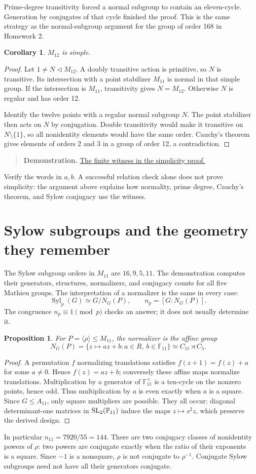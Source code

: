 \documentclass[12pt,letterpaper]{article}
\newtheorem{proposition}[theorem]{Proposition}
\newtheorem{corollary}[theorem]{Corollary}
\theoremstyle{definition}
\theoremstyle{remark}
\newenvironment{toolnote}{\begin{quote}\small\color{navy}}{\end{quote}}
\newcommand{\F}{\mathbb F}\newcommand{\Z}{\mathbb Z}
\DeclareMathOperator{\Syl}{Syl}
\newcommand{\pageheading}[1]{\clearpage\section{#1}}
\newcommand{\demolink}[2]{\href{https://gtevelev-max.github.io/mathieu/\##1}{#2}}
\newcommand{\demobox}[2]{\begin{toolnote}\textbf{Demonstration.} \demolink{#1}{#2}\end{toolnote}}
\begin{document}
Prime-degree transitivity forced a normal subgroup to contain an eleven-cycle. Generation by conjugates of that cycle finished the proof. This is the same strategy as the normal-subgroup argument for the group of order 168 in Homework 2.

\begin{corollary}
$M_{12}$ is simple.
\end{corollary}
\begin{proof}
Let $1\ne N\lhd M_{12}$. A doubly transitive action is primitive, so $N$ is transitive. Its intersection with a point stabilizer $M_{11}$ is normal in that simple group. If the intersection is $M_{11}$, transitivity gives $N=M_{12}$. Otherwise $N$ is regular and has order 12.

Identify the twelve points with a regular normal subgroup $N$. The point stabilizer then acts on $N$ by conjugation. Double transitivity would make it transitive on $N\setminus\{1\}$, so all nonidentity elements would have the same order. Cauchy's theorem gives elements of orders 2 and 3 in a group of order 12, a contradiction.
\end{proof}

\demobox{permutations?group=11}{The finite witness in the simplicity proof.} Verify the words in $a,b$. A successful relation check alone does not prove simplicity: the argument above explains how normality, prime degree, Cauchy's theorem, and Sylow conjugacy use the witness.

\hypertarget{sylow}{}
\pageheading{Sylow subgroups and the geometry they remember}
The Sylow subgroup orders in $M_{11}$ are $16,9,5,11$. The demonstration computes their generators, structures, normalizers, and conjugacy counts for all five Mathieu groups. The interpretation of a normalizer is the same in every case:
\[
 \Syl_p(G)\simeq G/N_G(P),\qquad n_p=[G:N_G(P)].
\]
The congruence $n_p\equiv1\pmod p$ checks an answer; it does not usually determine it.

\begin{proposition}
For $P=\langle\rho\rangle\le M_{11}$, the normalizer is the affine group
\[
 N_G(P)=\{z\mapsto az+b:a\in R,\ b\in\F_{11}\}\simeq C_{11}\rtimes C_5.
\]
\end{proposition}
\begin{proof}
A permutation $f$ normalizing translations satisfies $f(z+1)=f(z)+a$ for some $a\ne0$. Hence $f(z)=az+b$; conversely these affine maps normalize translations. Multiplication by a generator of $\F_{11}^{\times}$ is a ten-cycle on the nonzero points, hence odd. Thus multiplication by $a$ is even exactly when $a$ is a square. Since $G\le A_{11}$, only square multipliers are possible. They all occur: diagonal determinant-one matrices in $\SL_2(\F_{11})$ induce the maps $z\mapsto s^2z$, which preserve the derived design.
\end{proof}
In particular $n_{11}=7920/55=144$. There are two conjugacy classes of nonidentity powers of $\rho$: two powers are conjugate exactly when the ratio of their exponents is a square. Since $-1$ is a nonsquare, $\rho$ is not conjugate to $\rho^{-1}$. Conjugate Sylow subgroups need not have all their generators conjugate.
\end{document}
